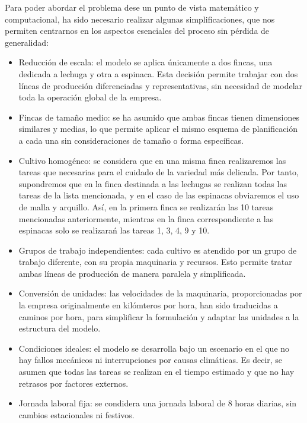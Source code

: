Para poder abordar el problema dese un punto de vista matemático y computacional, ha sido necesario realizar algunas simplificaciones, que nos permiten centrarnos en los aspectos esenciales del proceso
sin pérdida de generalidad:
\begin{itemize}
    \item Reducción de escala: el modelo se aplica únicamente a dos fincas, una dedicada a lechuga y otra a espinaca. 
          Esta decisión permite trabajar con dos líneas de producción diferenciadas y representativas, sin necesidad de modelar toda la operación global de la empresa.
    \item Fincas de tamaño medio: se ha asumido que ambas fincas tienen dimensiones similares y medias, lo que permite aplicar el mismo esquema de planificación
          a cada una sin consideraciones de tamaño o forma específicas.
    \item Cultivo homogéneo: se considera que en una misma finca realizaremos las tareas que necesarias para el cuidado de la variedad más delicada. 
          Por tanto, supondremos que en la finca destinada a las lechugas se realizan todas las tareas de la lista mencionada, y en el caso de las espinacas obviaremos el uso de malla y arquillo. 
          Así, en la primera finca se realizarán las 10 tareas mencionadas anteriormente, mientras en la finca correspondiente a las espinacas solo se realizarań las tareas 1, 3, 4, 9 y 10.
    \item Grupos de trabajo independientes: cada cultivo es atendido por  un grupo de trabajo diferente, con su propia maquinaria y recursos.
          Esto permite tratar ambas líneas de producción de manera paralela y simplificada.
    \item Conversión de unidades: las velocidades de la maquinaria, proporcionadas por la empresa originalmente en kilómteros por hora, han sido traducidas a caminos por hora,
          para simplificar la formulación y adaptar las unidades a la estructura del modelo.
    \item Condiciones ideales: el modelo se desarrolla bajo un escenario en el que no hay fallos mecánicos ni interrupciones por causas climáticas.
          Es decir, se asumen que todas las tareas se realizan en el tiempo estimado y que no hay retrasos por factores externos.
    \item Jornada laboral fija: se condidera una jornada laboral de 8 horas diarias, sin cambios estacionales ni festivos.
\end{itemize}
 
